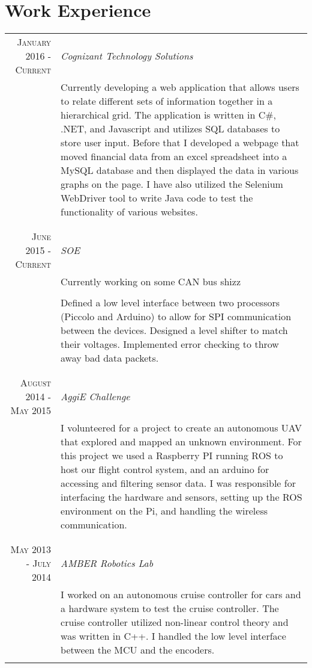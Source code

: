 \documentclass[a4paper,10pt]{article} %
\begin{document}
\section{Work Experience}

\begin{tabular}{r|p{11cm}}
\textsc{January 2016 - Current} & \emph{Cognizant Technology Solutions}\\
& \footnotesize{Currently developing a web application that allows users to relate different sets of information together in a hierarchical grid. The application is written in C\#, .NET, and Javascript and utilizes SQL databases to store user input. Before that I developed a webpage that moved financial data from an excel spreadsheet into a MySQL database and then displayed the data in various graphs on the page. I have also utilized the Selenium WebDriver tool to write Java code to test the functionality of various websites.}\\
\multicolumn{2}{c}{} \\
& \\

\textsc{June 2015 - Current} & \emph{SOE}\\
& \footnotesize{Currently working on some CAN bus shizz}\\
\\
& \footnotesize{Defined a low level interface between two processors (Piccolo and Arduino) to allow for SPI communication between the devices. Designed a level shifter to match their voltages. Implemented error checking to throw away bad data packets.}\\
\multicolumn{2}{c}{} \\
& \\

\textsc{August 2014 - May 2015} & \emph{AggiE Challenge}\\
& \footnotesize{I volunteered for a project to create an autonomous UAV that explored and mapped an unknown environment. For this project we used a Raspberry PI running ROS to host our flight control system, and an arduino for accessing and filtering sensor data. I was responsible for interfacing the hardware and sensors, setting up the ROS environment on the Pi, and handling the wireless communication.}\\
\multicolumn{2}{c}{} \\
& \\

\textsc{May 2013 - July 2014} & \emph{AMBER Robotics Lab}\\
& \footnotesize{I worked on an autonomous cruise controller for cars and a hardware system to test the cruise controller. The cruise controller utilized non-linear control theory and was written in C++. I handled the low level interface between the MCU and the encoders.}\\
\multicolumn{2}{c}{} \\

\end{tabular}
\end{document}
